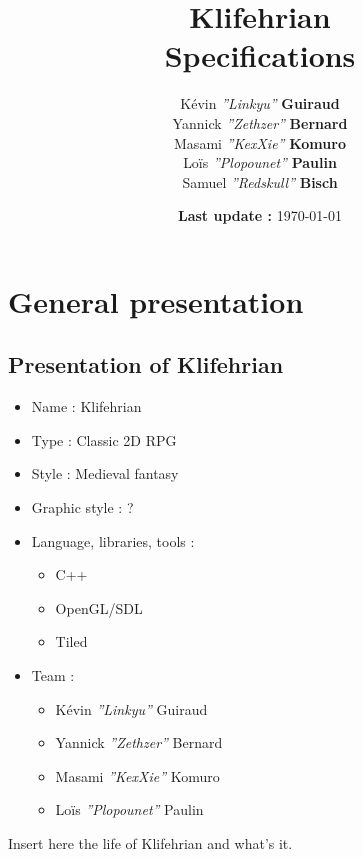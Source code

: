 \documentclass[a4paper,12pt]{book}
\title{\Huge{Klifehrian} \\ \large{Specifications}}
\author{K\'{e}vin \textit{''Linkyu''} \textbf{Guiraud} \\ Yannick \textit{''Zethzer''} \textbf{Bernard} \\ Masami \textit{''KexXie''} \textbf{Komuro} \\ Lo\"{i}s \textit{''Plopounet''} \textbf{Paulin} \\ Samuel \textit{''Redskull''} \textbf{Bisch}}
\date{\textbf{Last update :} \today}
\begin{document}
\maketitle
\thispagestyle{empty}
\setcounter{page}{0}
\part{General presentation}
\chapter{Presentation of Klifehrian}
\begin{itemize}
	\item Name : Klifehrian
	\item Type : Classic 2D RPG
	\item Style : Medieval fantasy
	\item Graphic style : ?
	\item Language, libraries, tools :
	\begin{itemize}
		\item C++
		\item OpenGL/SDL
		\item Tiled
	\end{itemize}
	\item Team :
	\begin{itemize}
		\item K\'{e}vin \textit{''Linkyu''} Guiraud
		\item Yannick \textit{''Zethzer''} Bernard
		\item Masami \textit{''KexXie''} Komuro
		\item Lo\"{i}s \textit{''Plopounet''} Paulin
	\end{itemize}
\end{itemize}
\newpage Insert here the life of Klifehrian and what's it.
\end{document}
